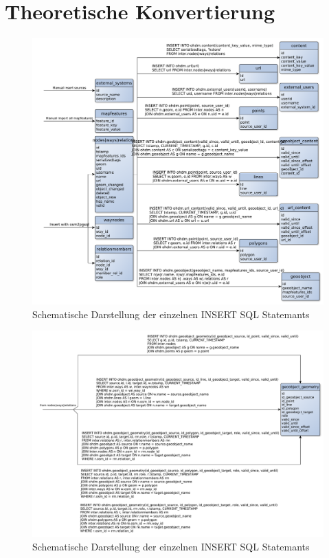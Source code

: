 \section{Theoretische Konvertierung}
\begin{figure}[h]
	\caption{Schematische Darstellung der einzelnen INSERT SQL Statemants}
	\includegraphics[width=\linewidth]{img/inter2ohdm_tableConvertionSchema1.pdf}
\end{figure}

\begin{figure}[h]
	\caption{Schematische Darstellung der einzelnen INSERT SQL Statemants}
	\includegraphics[width=\linewidth]{img/inter2ohdm_tableConvertionSchema2.pdf}
\end{figure}
